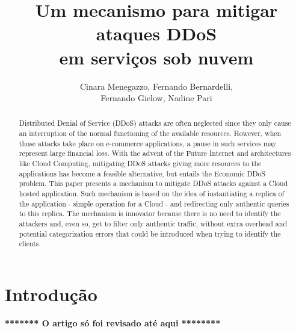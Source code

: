 \documentclass[a4paper, 12pt]{article}
\begin{document}
\title{Um mecanismo para mitigar ataques DDoS \\em serviços sob nuvem}


\author{
Cinara Menegazzo, Fernando Bernardelli, \\
Fernando Gielow, Nadine Pari
}
   
\address{Departamento de Informática -- Universidade Federal do Paraná\\
NR2 - Núcleo de Redes Sem Fio e Redes Avançadas\\
  Caixa Postal 19.081 -- 81.531-980 -- Curitiba -- PR -- Brasil
}     

\maketitle

\begin{abstract}
Distributed Denial of Service (DDoS) attacks are often neglected since they only cause an interruption of the normal functioning of the available resources. However, when those attacks take place on e-commerce applications, a pause in such services may represent large financial loss. With the advent of the Future Internet and architectures like Cloud Computing, mitigating DDoS attacks giving more resources to the applications has become a feasible alternative, but entails the Economic DDoS problem. This paper presents a mechanism to mitigate DDoS attacks against a Cloud hosted application. Such mechanism is based on the idea of instantiating a replica of the application - simple operation for a Cloud - and redirecting only authentic queries to this replica. The mechanism is innovator because there is no need to identify the attackers and, even so, get to filter only authentic traffic, without extra overhead and potential categorization errors that could be introduced when trying to identify the clients.
\end{abstract}

\begin{resumo}

\end{resumo}

\section{Introdução}


\textbf{******* O artigo só foi revisado até aqui ********}
\end{document}
